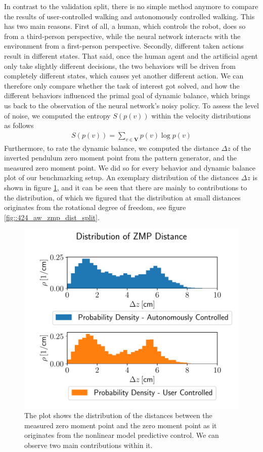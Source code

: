 In contrast to the validation split, there is no simple method anymore to compare the results of user-controlled walking and autonomously controlled walking. This has two main reasons. First of all, a human, which controls the robot, does so from a third-person perspective, while the neural network interacts with the environment from a first-person perspective. Secondly, different taken actions result in different states. That said, once the human agent and the artificial agent only take slightly different decisions, the two behaviors will be driven from completely different states, which causes yet another different action. We can therefore only compare whether the task of interest got solved, and how the different behaviors influenced the primal goal of dynamic balance, which brings us back to the observation of the neural network's noisy policy. To assess the level of noise, we computed the entropy $S(p(v))$ within the velocity distributions as follows
\begin{align}
	S(p(v)) = \sum_{v\in \bm{V}}p(v)\log p(v)
\end{align}
Furthermore, to rate the dynamic balance, we computed the distance $\Delta z$ of the inverted pendulum zero moment point from the pattern generator, and the measured zero moment point. We did so for every behavior and dynamic balance plot of our benchmarking setup. An exemplary distribution of the distances $\Delta z$ is shown in figure \ref{fig::424_aw_zmp_dist}, and it can be seen that there are mainly to contributions to the distribution, of which we figured that the distribution at small distances originates from the rotational degree of freedom, see figure \ref{fig::424_aw_zmp_dist_split}.
\begin{figure}[h!] 
	\centering
	\includegraphics[scale=.45]{chapters/11_autonomous_walking_experiments/img/zmp_distribution_benchmark.pdf}
	\caption{The plot shows the distribution of the distances between the measured zero moment point and the zero moment point as it originates from the nonlinear model predictive control. We can observe two main contributions within it.}
	\label{fig::424_aw_zmp_dist}
\end{figure} 
